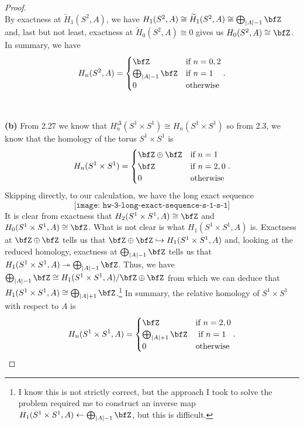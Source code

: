 \begin{proof}
\[\]
By exactness at $\widetilde H_1(S^2,A)$, we have $H_1(S^2,A)\cong\widetilde
H_1(S^2,A)\cong\bigoplus_{|A|-1}\bfZ$ and, last but not least, exactness at
$\widetilde H_0(S^2,A)\cong 0$ gives us $H_0(S^2,A)\cong\bfZ$. In summary,
we have
\begin{equation}
  \label{eq:homology-of-s-2-a}
H_n(S^2,A)=
\begin{cases}
\bfZ&\text{if $n=0,2$}\\
\bigoplus_{|A|-1}\bfZ&\text{if $n=1$}\\
0&\text{otherwise}
\end{cases}.
\end{equation}
\\\\
\textbf{(b)} From 2.27 we know that
$H_n^\Delta(S^1\times S^1)\cong H_n(S^1\times S^1)$ so from 2.3, we know
that the homology of the torus $S^1\times S^1$ is
\begin{equation}
\label{eq:homology-of-s-1-s-1}
H_n(S^1\times S^1)=
\begin{cases}
\bfZ\oplus\bfZ&\text{if $n=1$}\\
\bfZ&\text{if $n=2,0$}\\
0&\text{otherwise}
\end{cases}.
\end{equation}
Skipping directly, to our calculation, we have the long exact sequence
\begin{equation}
  \label{eq:long-exact-sequence-s-1-s-1}
\texttt{[image: hw-3-long-exact-sequence-s-1-s-1]}
\end{equation}
It is clear from exactness that $H_2(S^1\times S^1,A)\cong\bfZ$ and
$H_0(S^1\times S^1,A)\cong\bfZ$. What is not clear is what $H_1(S^1\times
S^1,A)$ is. Exactness at $\bfZ\oplus\bfZ$ tells us that
$\bfZ\oplus\bfZ\hookrightarrow H_1(S^1\times S^1,A)$ and, looking at the
reduced homology, exactness at $\bigoplus_{|A|-1}\bfZ$ tells us that
$H_1(S^1\times S^1,A)\twoheadrightarrow\bigoplus_{|A|-1}\bfZ$. Thus,
we have $\bigoplus_{|A|-1}\bfZ\cong H_1(S^1\times S^1,A)/\bfZ\oplus\bfZ$
from which we can deduce that $H_1(S^1\times
S^1,A)\cong\bigoplus_{|A|+1}\bfZ$.\footnote{I know this is not strictly
  correct, but the approach I took to solve the problem required me to
  construct an inverse map $H_1(S^1\times
  S^1,A)\leftarrow\bigoplus_{|A|-1}\bfZ$, but this is difficult.} In summary, the relative homology of
$S^1\times S^1$ with respect to $A$ is
\begin{equation}
  \label{eq:homology-of-s-1-s-1-a}
H_n(S^1\times S^1,A)=
\begin{cases}
\bfZ&\text{if $n=2,0$}\\
\bigoplus_{|A|+1}\bfZ&\text{ if $n=1$}\\
0&\text{otherwise}
\end{cases}.
\end{equation}
\qedhere
\end{proof}
\newpage

